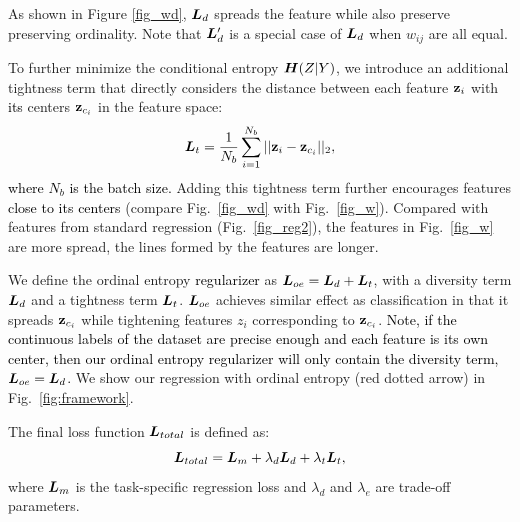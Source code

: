 \documentclass{article} %
\def\shihao{\textcolor{black}}
\begin{document}
As shown in Figure \ref{fig_wd}, ${\bm{L}}_d$ spreads the feature while also preserve preserving ordinality.  Note that ${\bm{L}}'_d$ is a special case of ${\bm{L}}_d$ when $w_{ij}$ are all equal.

To further minimize the conditional entropy ${\bm{H}}(Z|Y)$, we introduce an additional tightness term that directly considers the distance between each feature ${\bf z}_i$ with 
\shihao{its} centers ${\bf z}_{c_i}$ in the feature space:
\begin{equation}
    {\bm{L}}_t = \frac{1}{N_{b}}\sum_{i=1}^{N_{b}}||{\bf z}_i-{\bf z}_{c_i}||_2,
\end{equation}
\shihao{where $N_{b}$ is the batch size.} Adding this tightness term further encourages features \shihao{close to its centers} (compare Fig.~\ref{fig_wd} with Fig.~\ref{fig_w}).  
Compared with features from standard regression (Fig.~\ref{fig_reg2}), the features in Fig.~\ref{fig_w} are more spread, \ie the lines formed by the features are longer. 


We define the ordinal entropy \shihao{regularizer} as ${\bm{L}}_{oe} = {\bm{L}}_d + {\bm{L}}_t$, with a diversity term ${\bm{L}}_d$ and a tightness term ${\bm{L}}_t$. ${\bm{L}}_{oe}$ achieves similar effect as classification in that it spreads ${\bf z}_{c_i}$ while tightening features $z_i$ corresponding to ${\bf z}_{c_i}$. \shihao{Note, if the continuous labels of the dataset are precise enough and each feature is its own center, then our ordinal entropy regularizer will only contain the diversity term, \ie ${\bm{L}}_{oe} = {\bm{L}}_d$.}
We show our regression with ordinal entropy (red dotted arrow) in Fig.~\ref{fig:framework}.

The final loss function ${\bm{L}}_{total}$ is defined as:
\begin{equation}
    {\bm{L}}_{total} = {\bm{L}}_m + \lambda_d{\bm{L}}_d + \lambda_t{\bm{L}}_t,
\end{equation}
where ${\bm{L}}_m$ is the task-specific regression loss and $\lambda_d$ and $\lambda_e$ are trade-off parameters.
\end{document}
